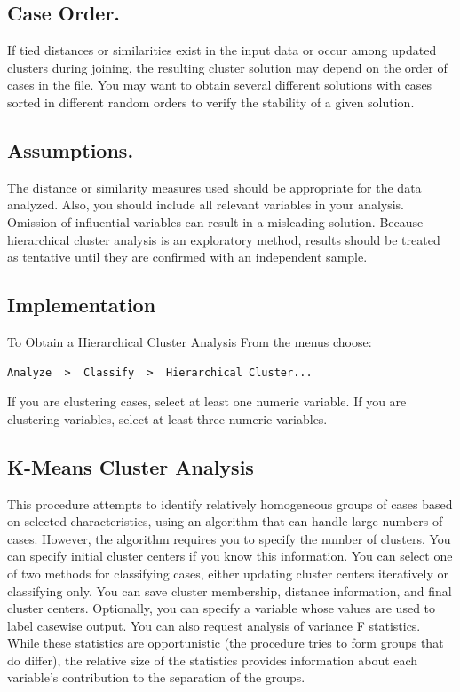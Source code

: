 \documentclass[a4paper,12pt]{article}
\begin{document}
\subsection*{Case Order.} If tied distances or similarities exist in the input data or occur among updated clusters during joining, the resulting cluster solution may depend on the order of cases in the file. You may want to obtain several different solutions with cases sorted in different random orders to verify the stability of a given solution.
\subsection*{Assumptions.}  The distance or similarity measures used should be appropriate for the data analyzed. Also, you should include all relevant variables in your analysis. Omission of influential variables can result in a misleading solution. Because hierarchical cluster analysis is an exploratory method, results should be treated as tentative until they are confirmed with an independent sample.



 \subsection*{Implementation}


To Obtain a Hierarchical Cluster Analysis
From the menus choose:
\begin{verbatim}
Analyze  >  Classify  >  Hierarchical Cluster...

\end{verbatim}
If you are clustering cases, select at least one numeric variable. If you are clustering variables, select at least three numeric variables. 


 
\subsection*{K-Means Cluster Analysis}
This procedure attempts to identify relatively homogeneous groups of cases based on selected characteristics, using an algorithm that can handle large numbers of cases. However, the algorithm requires you to specify the number of clusters. You can specify initial cluster centers if you know this information. You can select one of two methods for classifying cases, either updating cluster centers iteratively or classifying only. You can save cluster membership, distance information, and final cluster centers. Optionally, you can specify a variable whose values are used to label casewise output. You can also request analysis of variance F statistics. While these statistics are opportunistic (the procedure tries to form groups that do differ), the relative size of the statistics provides information about each variable's contribution to the separation of the groups.
\end{document}
